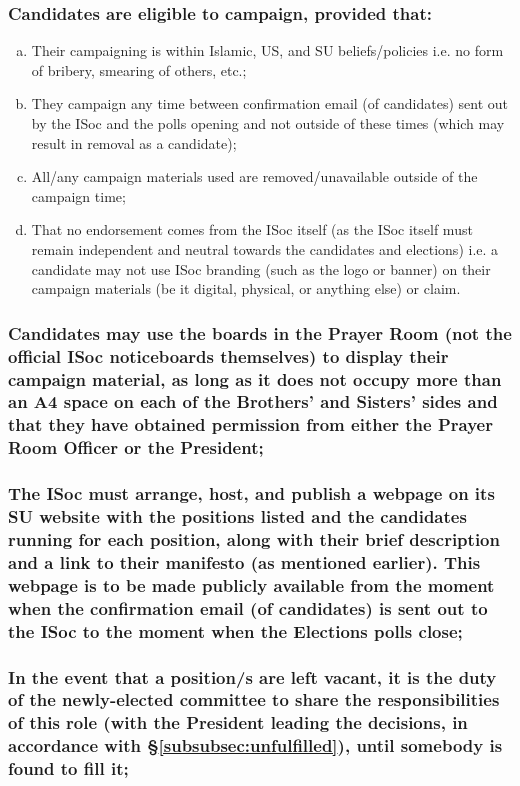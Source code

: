 \documentclass[12pt]{article}
\begin{document}
\subsubsection{Candidates are eligible to campaign, provided that:}
\begin{displayquote}
\begin{enumerate}[a.]
\item Their campaigning is within Islamic, US, and SU beliefs/policies i.e. no form of bribery, smearing of others, etc.;
\item They campaign any time between confirmation email (of candidates) sent out by the ISoc and the polls opening and not outside of these times (which may result in removal as a candidate);
\item All/any campaign materials used are removed/unavailable outside of the campaign time;
\item That no endorsement comes from the ISoc itself (as the ISoc itself must remain independent and neutral towards the candidates and elections) i.e. a candidate may not use ISoc branding (such as the logo or banner) on their campaign materials (be it digital, physical, or anything else) or claim.
\end{enumerate}
\end{displayquote}
\subsubsection{Candidates may use the boards in the Prayer Room (not the official ISoc noticeboards themselves) to display their campaign material, as long as it does not occupy more than an A4 space on each of the Brothers' and Sisters' sides and that they have obtained permission from either the Prayer Room Officer or the President;}
\subsubsection{The ISoc must arrange, host, and publish a webpage on its SU website with the positions listed and the candidates running for each position, along with their brief description and a link to their manifesto (as mentioned earlier). This webpage is to be made publicly available from the moment when the confirmation email (of candidates) is sent out to the ISoc to the moment when the Elections polls close;}
\subsubsection{In the event that a position/s are left vacant, it is the duty of the newly-elected committee to share the responsibilities of this role (with the President leading the decisions, in accordance with \S\ref{subsubsec:unfulfilled}), until somebody is found to fill it;}
\end{document}
